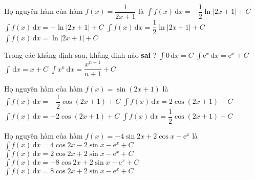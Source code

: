 \begin{ex}%
Họ nguyên hàm của hàm $f(x) = \dfrac {1}{2x+1} $ là 
\choice
{$\displaystyle\int f(x) \mathrm{\,d}x = -\dfrac {1}{2} \ln \left|2x+1\right| + C$}	
{$\displaystyle\int f(x) \mathrm{\,d}x = -\ln \left|2x+1\right| + C$}
{\True $\displaystyle\int f(x) \mathrm{\,d}x = \dfrac {1}{2} \ln \left|2x+1\right| + C$}
{$\displaystyle\int f(x) \mathrm{\,d}x = \ln \left|2x+1\right| + C$}
\end{ex}
\begin{ex}%
	Trong các khẳng định sau, khẳng định nào \textbf{sai} ?
	\choice
{$\displaystyle\int 0 \mathrm{\,d}x = C$}	
{$\displaystyle\int \mathrm{e}^x \mathrm{\,d}x = \mathrm {e}^x + C$}
{$\displaystyle\int \mathrm{\,d}x = x + C$}
{\True $\displaystyle\int x^{n} \mathrm{\,d}x = \dfrac{x^{n+1}}{n+1}+ C$}
\end{ex}
\begin{ex}%
	Họ nguyên hàm của hàm $f(x) = \sin {\left(2x+1\right)}$ là 
	\choice
	{\True $\displaystyle\int f(x) \mathrm{\,d}x = -\dfrac{1}{2} \cos {\left(2x+1\right)} + C$}	
	{$\displaystyle\int f(x) \mathrm{\,d}x = 2 \cos {\left(2x+1\right)} + C$}
	{$\displaystyle\int f(x) \mathrm{\,d}x = -2\cos {\left(2x+1\right)} + C$}
	{$\displaystyle\int f(x) \mathrm{\,d}x = \dfrac{1}{2} \cos {\left(2x+1\right)} + C$}
\end{ex}
\begin{ex}%
		Họ nguyên hàm của hàm $f(x) = -4\sin {2x} +2\cos {x}- \mathrm {e}^x$ là 
	\choice
	{$\displaystyle\int f(x) \mathrm{\,d}x = 4\cos {2x} -2\sin {x}- \mathrm {e}^x + C$}	
	{\True $\displaystyle\int f(x) \mathrm{\,d}x = 2\cos {2x} +2\sin {x}- \mathrm {e}^x + C$}
	{$\displaystyle\int f(x) \mathrm{\,d}x = -8\cos {2x} +2\sin {x}- \mathrm {e}^x + C$}
	{$\displaystyle\int f(x) \mathrm{\,d}x = 8\cos {2x} +2\sin {x}- \mathrm {e}^x + C$}
\end{ex}
